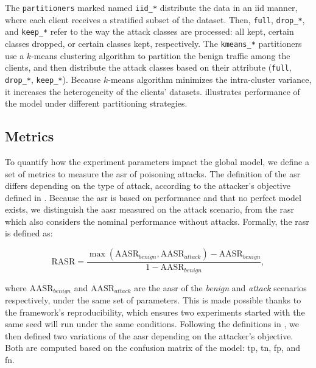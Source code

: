 
The \texttt{partitioners} marked named \texttt{iid\_*} distribute the data in an \gls{iid} manner, where each client receives a stratified\footnotemark{} subset of the dataset.
Then, \texttt{full}, \texttt{drop\_*}, and \texttt{keep\_*} refer to the way the attack classes are processed: all kept, certain classes dropped, or certain classes kept, respectively.
The \texttt{kmeans\_*} partitioners use a $k$-means clustering algorithm to partition the benign traffic among the clients, and then distribute the attack classes based on their attribute (\texttt{full}, \texttt{drop\_*}, \texttt{keep\_*}).
Because $k$-means algorithm minimizes the intra-cluster variance, it increases the heterogeneity of the clients' datasets.
 illustrates performance of the model under different partitioning strategies.



\subsection{Metrics\label{sec:assess.method.metrics}}

To quantify how the experiment parameters impact the global model, we define a set of metrics to measure the \gls{asr} of poisoning attacks.
The definition of the \gls{asr} differs depending on the type of attack, according to the attacker's objective defined in .
Because the \gls{asr} is based on performance and that no perfect model exists, we distinguish the \gls{aasr} measured on the attack scenario, from the \gls{rasr} which also considers the nominal performance without attacks.
Formally, the \gls{rasr} is defined as:

\begin{equation}
  \label{eq:rasr}
  \text{RASR} = \frac
    {\max(\text{AASR}_{benign}, \text{AASR}_{attack}) - \text{AASR}_{benign}}
    {1 - \text{AASR}_{benign}},
\end{equation}

where $\text{AASR}_{benign}$ and $\text{AASR}_{attack}$ are the \gls{aasr} of the \emph{benign} and \emph{attack} scenarios respectively, under the same set of parameters. 
This is made possible thanks to the framework's reproducibility, which ensures two experiments started with the same seed will run under the same conditions.
Following the definitions in , we then defined two variations of the \gls{aasr} depending on the attacker's objective.
Both are computed based on the confusion matrix of the model: \gls{tp}, \gls{tn}, \gls{fp}, and \gls{fn}.

